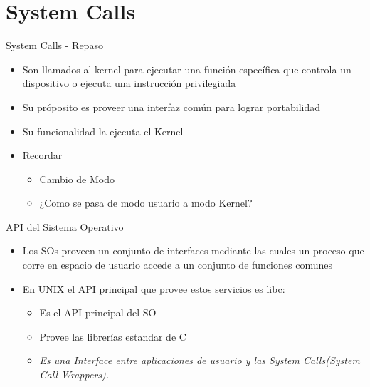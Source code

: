 \section{System Calls}

\begin{frame}{System Calls - Repaso}
  \begin{itemize}
  \item Son llamados al kernel para ejecutar una función específica que controla un dispositivo o ejecuta una instrucción privilegiada 
  \item Su próposito es proveer una interfaz común para lograr portabilidad
  \item Su funcionalidad la ejecuta el Kernel   
  \item Recordar
  \begin{itemize}
    \item Cambio de Modo
    \item ¿Como se pasa de modo usuario a modo Kernel?
  \end{itemize} 

  \end{itemize}
 
\end{frame}


\begin{frame}{API del Sistema Operativo}
  \begin{itemize}
  \item Los SOs proveen un conjunto de interfaces mediante las cuales un proceso que corre en espacio de usuario accede a un conjunto de funciones comunes
 \begin{center}
   \end{center}

  \item En UNIX el API principal que provee estos servicios es libc:
  \begin{itemize}
    \item Es el \alert{API} principal del SO
    \item Provee las librerías estandar de C
    \item \textit{Es una Interface entre aplicaciones de usuario y las \alert{System Calls}(System Call Wrappers).} 
      \end{itemize} 
  \end{itemize}
\end{frame}



